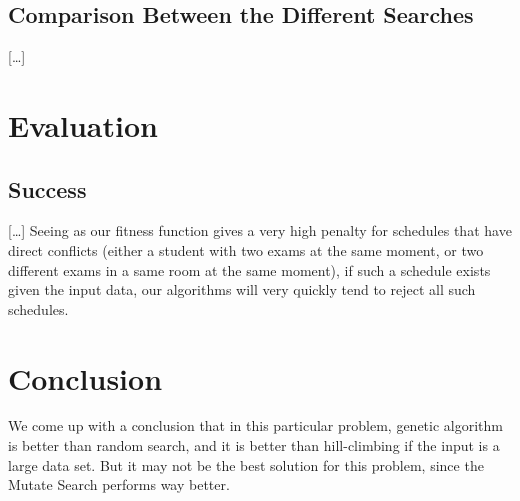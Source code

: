 \documentclass[letterpaper]{article}
\begin{document}
  \subsection{Comparison Between the Different Searches}
    [\ldots]
  
\section{Evaluation}
  \subsection{Success}
    [\ldots]
    Seeing as our fitness function gives a very high penalty for schedules that have direct
    conflicts (either a student with two exams at the same moment, or two different exams
    in a same room at the same moment), if such a schedule exists given the input data, our
    algorithms will very quickly tend to reject all such schedules.
  
\section{Conclusion}
  We come up with a conclusion that in this particular problem, genetic algorithm
  is better than random search, and it is better than hill-climbing if the input 
  is a large data set. But it may not be the best solution for this problem, since
  the Mutate Search performs way better.
  


\end{document}
